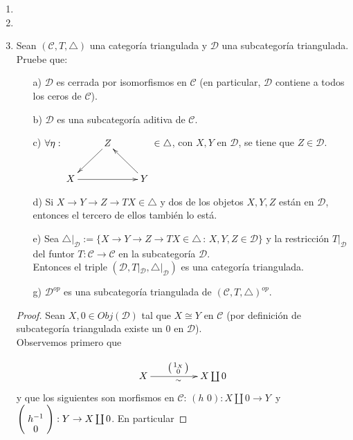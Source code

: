 \documentclass{article}
\newcommand{\spmat}[1]{%
  \left(\begin{smallmatrix}#1\end{smallmatrix}\right)%
}
\begin{document}
\begin{enumerate}
\begin{proof}
\end{proof}

\item
\item
\item Sean $(\mathscr{C},T,\triangle)$ una categoría triangulada y $\mathscr{D}$ una subcategoría triangulada. Pruebe que:
\begin{itemize}
\item[a)] $\mathscr{D}$ es cerrada por isomorfismos en $\mathscr{C}$ (en particular, $\mathscr{D}$ contiene a todos los ceros de $\mathscr{C}$).

\item[b)] $\mathscr{D}$ es una subcategoría aditiva de  $\mathscr{C}$.

\item[c)] $\forall \eta:\xymatrix{&Z\ar[ld]&\\ X\ar[rr] & &Y\ar[ul]}\in \triangle $, con $X,Y$ en $\mathscr{D}$, se tiene que $Z\in \mathscr{D}$.

\item[d)] Si $X\to Y\to Z\to TX \in \triangle$ y dos de los objetos $X,Y,Z$ están en $\mathscr{D}$, entonces el tercero de ellos también lo está.

\item[e)] Sea $\triangle|_\mathscr{D}:=\{X\to Y\to Z\to TX \in \triangle\,:\, X,Y,Z\in \mathscr{D}\}$ y la
restricción $T|_\mathscr{D}$ del funtor $T:\mathscr{C}\to\mathscr{C}$ en la subcategoría $\mathscr{D}$.\\
Entonces el triple $(\mathscr{D},T|_\mathscr{D},\triangle|_\mathscr{D})$ es una categoría triangulada.

\item[g)] $\mathscr{D}^{op}$ es una subcategoría triangulada de $(\mathscr{C},T,\triangle)^{op}$.
\end{itemize}

\begin{proof}
 Sean $X,0\in Obj(\mathscr{D})$ tal que $X\cong Y$ en $\mathscr{C}$ (por definición de subcategoría triangulada existe un $0$ en 
$\mathscr{D}$).\\

Observemos primero que

\begin{equation*}
\xymatrix@C+2pc{X\ar[r]_{\sim}^{\spmat{1_X \\ 0}}& X\coprod 0}\\
\end{equation*}
y que los siguientes son morfismos en $\mathscr{C}$:  $(h\,\,0): X\coprod 0\rightarrow Y$\,\,\,y\,\,\, 
$\left(\xymatrix@R=-1mm{h^{-1}\\0}\right):Y\rightarrow X\coprod 0$. En particular 


\end{proof}
\end{enumerate}
\end{document}
